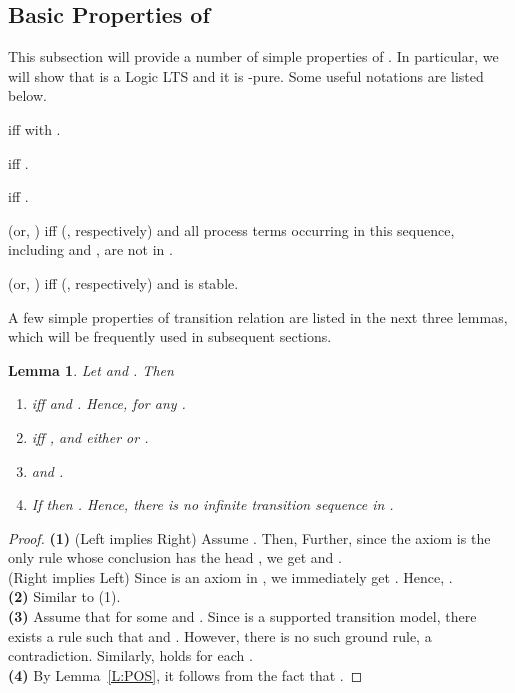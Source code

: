 \documentclass{elsarticle}
\theoremstyle{plain}
\newtheorem{lemma}[theorem]{Lemma}
\theoremstyle{definition}
\begin{document}
\subsection{Basic Properties of }

This subsection will provide a number of simple properties of . In particular, we will show that  is a Logic LTS and it is -pure.
Some useful notations are listed below.

 iff  with .

 iff .

 iff .

 (or, ) iff   (, respectively) and all process terms  occurring in this sequence, including  and , are not in .

 (or, ) iff  (, respectively) and  is stable.

A few simple properties of transition relation  are listed in the next three lemmas, which will be frequently used in subsequent sections.

\begin{lemma}\label{L:Basic_I}
Let  and . Then
    \begin{enumerate}
      \item  iff  and . Hence,  for any .
      \item  iff , and either  or .
      \item  and .
      \item If  then . Hence, there is no infinite transition sequence in .
    \end{enumerate}
\end{lemma}
\begin{proof}
  \noindent \textbf{(1)} (Left implies Right) Assume . Then, 
  Further, since the axiom  is the only rule whose conclusion has the head , we get
    and .\\

  \noindent (Right implies Left) Since  is an axiom in , we immediately get . Hence, . \\

  \noindent \textbf{(2)} Similar to (1). \\

  \noindent \textbf{(3)} Assume that  for some  and .
  Since  is a supported transition model, there exists a rule  such that  and . However, there is no such ground rule, a contradiction.
  Similarly,  holds for each .\\

  \noindent \textbf{(4)} By Lemma~\ref{L:POS}, it follows from the fact that
   .
\end{proof}
\end{document}
